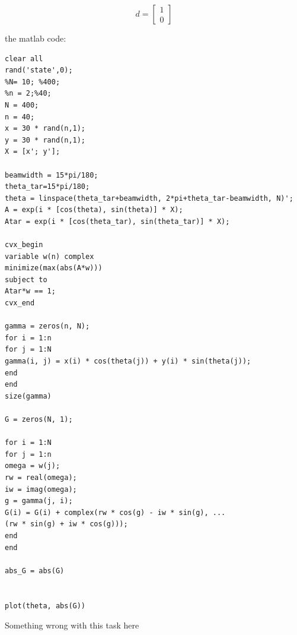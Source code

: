 \documentclass{article}
\begin{document}
$$
d = 
\begin{bmatrix}
1\\0
\end{bmatrix}
$$

the matlab code:

\begin{verbatim}
clear all
rand('state',0);
%N= 10; %400;
%n = 2;%40;
N = 400;
n = 40;
x = 30 * rand(n,1);
y = 30 * rand(n,1);
X = [x'; y'];

beamwidth = 15*pi/180;
theta_tar=15*pi/180;
theta = linspace(theta_tar+beamwidth, 2*pi+theta_tar-beamwidth, N)';
A = exp(i * [cos(theta), sin(theta)] * X);
Atar = exp(i * [cos(theta_tar), sin(theta_tar)] * X);

cvx_begin
variable w(n) complex
minimize(max(abs(A*w)))
subject to
Atar*w == 1;
cvx_end

gamma = zeros(n, N);
for i = 1:n
for j = 1:N
gamma(i, j) = x(i) * cos(theta(j)) + y(i) * sin(theta(j));
end
end
size(gamma)

G = zeros(N, 1);

for i = 1:N
for j = 1:n
omega = w(j);
rw = real(omega);
iw = imag(omega);
g = gamma(j, i);
G(i) = G(i) + complex(rw * cos(g) - iw * sin(g), ...
(rw * sin(g) + iw * cos(g)));
end
end

abs_G = abs(G)


plot(theta, abs(G))
\end{verbatim}

Something wrong with this task here
\end{document}

